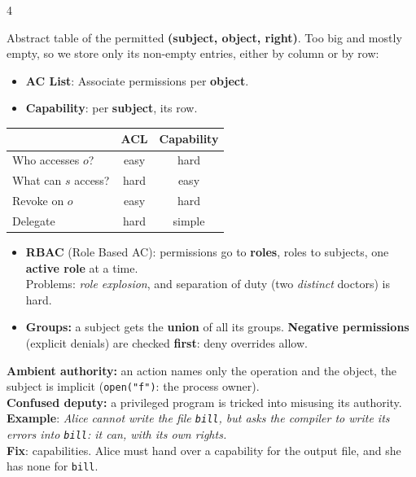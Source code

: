 \documentclass[8pt,a4paper,landscape]{extarticle}
\begin{document}
\begin{multicols*}{4}
\begin{defn}[title=Access control matrix]
    Abstract table of the permitted \textbf{(subject, object, right)}. Too big and mostly empty, so we store only its non-empty entries, either by column or by row:
    \begin{itemize}
        \item \textbf{AC List}: Associate permissions per \textbf{object}.
        \item \textbf{Capability}: per \textbf{subject}, its row.
    \end{itemize}
    \begin{center}
    \begin{tabular}{l|c|c}
                             & ACL  & Capability \\ \hline
        Who accesses $o$?    & easy & hard       \\
        What can $s$ access? & hard & easy       \\
        Revoke on $o$        & easy & hard       \\
        Delegate             & hard & simple     \\
    \end{tabular}
    \end{center}
\end{defn}

\begin{prop}[title=Roles and groups]
    \begin{itemize}
        \item \textbf{RBAC} (Role Based AC): permissions go to \textbf{roles}, roles to subjects, one \textbf{active role} at a time.\\Problems: \textit{role explosion}, and separation of duty (two \textit{distinct} doctors) is hard.
        \item \textbf{Groups:} a subject gets the \textbf{union} of all its groups. \textbf{Negative permissions} (explicit denials) are checked \textbf{first}: deny overrides allow.
    \end{itemize}
\end{prop}

\begin{thm}[title={Ambient authority, confused deputy}]
    \textbf{Ambient authority:} an action names only the operation and the object, the subject is implicit (\texttt{open("f")}: the process owner).\\
    \textbf{Confused deputy:} a privileged program is tricked into misusing its authority.\\
    \textbf{Example}: \textit{Alice cannot write the file \texttt{bill}, but asks the compiler to write its errors into \texttt{bill}: it can, with its own rights.}\\
    \textbf{Fix}: capabilities. Alice must hand over a capability for the output file, and she has none for \texttt{bill}.
\end{thm}


\end{multicols*}
\end{document}
